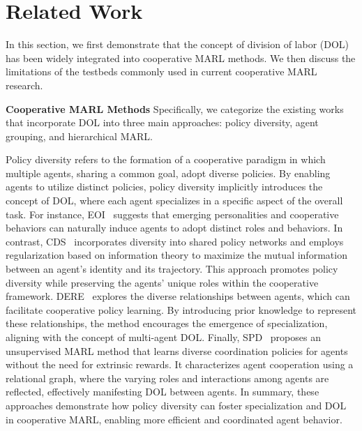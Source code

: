 \section{Related Work}
In this section, we first demonstrate that the concept of division of labor (DOL) has been widely integrated into cooperative MARL methods.
We then discuss the limitations of the testbeds commonly used in current cooperative MARL research.

\textbf{Cooperative MARL Methods}
Specifically, we categorize the existing works that incorporate DOL into three main approaches: policy diversity, agent grouping, and hierarchical MARL.

Policy diversity refers to the formation of a cooperative paradigm in which multiple agents, sharing a common goal, adopt diverse policies.
By enabling agents to utilize distinct policies, policy diversity implicitly introduces the concept of DOL, where each agent specializes in a specific aspect of the overall task.
For instance, EOI~\cite{jiang2021emergence} suggests that emerging personalities and cooperative behaviors can naturally induce agents to adopt distinct roles and behaviors.
In contrast, CDS~\cite{li2021celebrating} incorporates diversity into shared policy networks and employs regularization based on information theory to maximize the mutual information between an agent’s identity and its trajectory.
This approach promotes policy diversity while preserving the agents' unique roles within the cooperative framework.
DERE~\cite{jiang2022diverse} explores the diverse relationships between agents, which can facilitate cooperative policy learning.
By introducing prior knowledge to represent these relationships, the method encourages the emergence of specialization, aligning with the concept of multi-agent DOL.
Finally, SPD~\cite{jiang2022spd} proposes an unsupervised MARL method that learns diverse coordination policies for agents without the need for extrinsic rewards.
It characterizes agent cooperation using a relational graph, where the varying roles and interactions among agents are reflected, effectively manifesting DOL between agents.
In summary, these approaches demonstrate how policy diversity can foster specialization and DOL in cooperative MARL, enabling more efficient and coordinated agent behavior.

